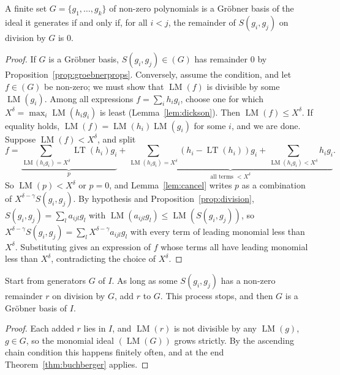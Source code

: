 \begin{theorem}\label{thm:buchberger}
A finite set $G=\{g_1,\dots,g_k\}$ of non-zero polynomials is a Gröbner basis of the ideal it generates if and only if, for all $i<j$, the remainder of $S(g_i,g_j)$ on division by $G$ is $0$.
\end{theorem}

\begin{proof}
If $G$ is a Gröbner basis, $S(g_i,g_j)\in(G)$ has remainder $0$ by Proposition~\ref{prop:groebnerprops}. Conversely, assume the condition, and let $f\in(G)$ be non-zero; we must show that $\operatorname{LM}(f)$ is divisible by some
$\operatorname{LM}(g_i)$. Among all expressions $f=\sum_ih_ig_i$, choose one for which $X^\delta=\max_i\operatorname{LM}(h_ig_i)$ is least (Lemma~\ref{lem:dickson}). Then $\operatorname{LM}(f)\le X^\delta$. If equality holds, $\operatorname{LM}(f)=\operatorname{LM}(h_i)\operatorname{LM}(g_i)$ for some
$i$, and we are done. Suppose $\operatorname{LM}(f)<X^\delta$, and split
\[f=\underbrace{\sum_{\operatorname{LM}(h_ig_i)=X^\delta}\operatorname{LT}(h_i)g_i}_{p}+\underbrace{\sum_{\operatorname{LM}(h_ig_i)=X^\delta}(h_i-\operatorname{LT}(h_i))g_i+\sum_{\operatorname{LM}(h_ig_i)<X^\delta}h_ig_i}_{\text{all terms }<X^\delta}.\]
So $\operatorname{LM}(p)<X^\delta$ or $p=0$, and Lemma~\ref{lem:cancel} writes $p$ as a combination of $X^{\delta-\gamma}S(g_i,g_j)$. By hypothesis and Proposition~\ref{prop:division}, $S(g_i,g_j)=\sum_la_{ijl}g_l$ with
$\operatorname{LM}(a_{ijl}g_l)\le\operatorname{LM}(S(g_i,g_j))$, so $X^{\delta-\gamma}S(g_i,g_j)=\sum_lX^{\delta-\gamma}a_{ijl}g_l$ with every term of leading monomial less than $X^\delta$. Substituting gives an expression of $f$ whose terms all have leading
monomial less than $X^\delta$, contradicting the choice of $X^\delta$.
\end{proof}

\begin{corollary}\label{cor:buchalg}
Start from generators $G$ of $I$. As long as some $S(g_i,g_j)$ has a non-zero remainder $r$ on division by $G$, add $r$ to $G$. This process stops, and then $G$ is a Gröbner basis of $I$.
\end{corollary}

\begin{proof}
Each added $r$ lies in $I$, and $\operatorname{LM}(r)$ is not divisible by any $\operatorname{LM}(g)$, $g\in G$, so the monomial ideal $(\operatorname{LM}(G))$ grows strictly. By the ascending chain condition this happens finitely often, and at
the end Theorem~\ref{thm:buchberger} applies.
\end{proof}

